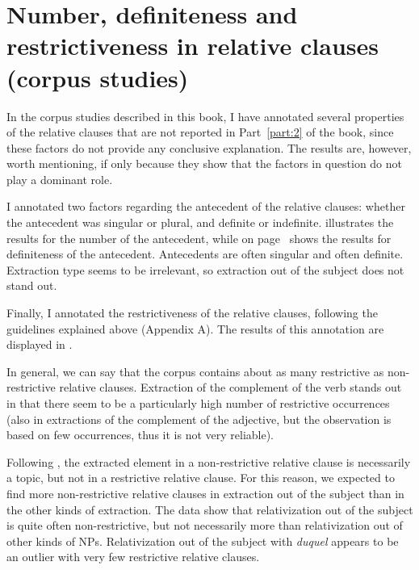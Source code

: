 \chapter{Number, definiteness and restrictiveness in relative clauses (corpus studies)}
\label{ch:other-factors}

In the corpus studies described in this book, I have annotated several properties of the relative clauses that are not reported in Part~\ref{part:2} of the book, since these factors do not provide any conclusive explanation. The results are, however, worth mentioning, if only because they show that the factors in question do not play a dominant role.

\begin{sloppypar}
I annotated two factors regarding the antecedent of the relative clauses: whether the antecedent was singular or plural, and definite or indefinite.  illustrates the results for the number of the antecedent, while  on page~\pageref{fig:definiteness-corpus} shows the results for definiteness of the antecedent. Antecedents are often singular and often definite. Extraction type seems to be irrelevant, so extraction out of the subject does not stand out.
\end{sloppypar}

Finally, I annotated the restrictiveness of the relative clauses, following the guidelines explained above (Appendix A). The results of this annotation are displayed in .

In general, we can say that the corpus contains about as many restrictive as non-restrictive relative clauses. Extraction of the complement of the verb stands out in that there seem to be a particularly high number of restrictive occurrences (also in extractions of the complement of the adjective, but the observation is based on few occurrences, thus it is not very reliable). 


\begin{sloppypar}
Following \citet{Song.2017}, the extracted element in a non-restrictive relative clause is necessarily a topic, but not in a restrictive relative clause. For this reason, we expected to find more non-restrictive relative clauses in extraction out of the subject than in the other kinds of extraction. The data show that relativization out of the subject is quite often non-restrictive, but not necessarily more than relativization out of other kinds of NPs. Relativization out of the subject with \emph{duquel} appears to be an outlier with very few restrictive relative clauses.
\end{sloppypar}

